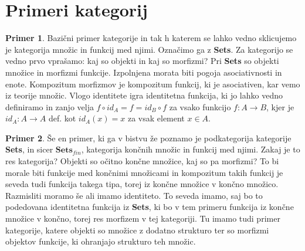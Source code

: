 \documentclass[12pt,a4paper]{book}
\theoremstyle{definition}
\theoremstyle{plain}
\theoremstyle{definition}
\newtheorem{primer}{Primer}[section]
\theoremstyle{remark}
\newcommand{\cat}[1]{\textbf{#1}}
\begin{document}
\section{Primeri kategorij}

\begin{primer}
Bazični primer kategorije in tak h katerem se lahko vedno sklicujemo je kategorija množic in funkcij med njimi. Označimo ga z \cat{Sets}. Za kategorijo se vedno prvo vprašamo: kaj so objekti in kaj so morfizmi? Pri \textbf{Sets} so objekti množice in morfizmi funkcije.
Izpolnjena morata biti pogoja asociativnosti in enote.
Kompozitum morfizmov je kompozitum funkcij, ki je asociativen, kar vemo iz teorije množic.
Vlogo identitete igra identitetna funkcija, ki jo lahko vedno definiramo in zanjo velja $f \circ id_A = f = id_B \circ f$ za vsako funkcijo $f : A \to B$, kjer je $id_A : A \to A$ def. kot $id_A(x) = x$ za vsak element $x \in A$.
\end{primer}

\begin{primer}
Še en primer, ki ga v bistvu že poznamo je podkategorija kategorije \cat{Sets}, in sicer $\cat{Sets}_{fin}$, kategorija končnih množic in funkcij med njimi. Zakaj je to res kategorija? Objekti so očitno končne množice, kaj so pa morfizmi? 
To bi morale biti funkcije med končnimi množicami in kompozitum takih funkcij je seveda tudi funkcija takega tipa, torej iz končne množice v končno množico. Razmisliti moramo še ali imamo identiteto. To seveda imamo, saj bo to podedovana identitetna funkcija iz \cat{Sets}, ki bo v tem primeru funkcija iz končne množice v končno, torej res morfizem v tej kategoriji. Tu imamo tudi primer kategorije, katere objekti so množice z dodatno strukturo ter so morfizmi objektov funkcije, ki ohranjajo strukturo teh množic.
\end{primer}
\end{document}
